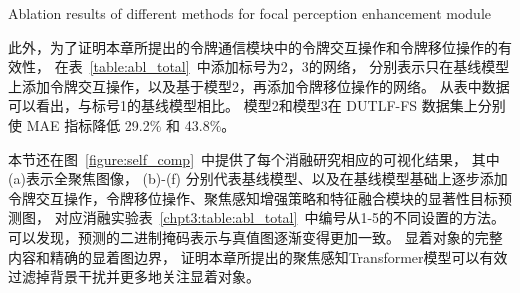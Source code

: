 \begin{table}[!ht]
	{Ablation results of different methods for focal perception enhancement module}
	
	\centering
	\label{table:abl_methods}
\end{table}




此外，为了证明本章所提出的令牌通信模块中的令牌交互操作和令牌移位操作的有效性，
在表~\ref{table:abl_total}~中添加标号为2，3的网络，
分别表示只在基线模型上添加令牌交互操作，以及基于模型2，再添加令牌移位操作的网络。
从表中数据可以看出，与标号1的基线模型相比。
模型2和模型3在 DUTLF-FS 数据集上分别使 MAE 指标降低 29.2\% 和 43.8\%。 




本节还在图~\ref{figure:self_comp}~中提供了每个消融研究相应的可视化结果，
其中(a)表示全聚焦图像，
(b)-(f) 分别代表基线模型、以及在基线模型基础上逐步添加
令牌交互操作，令牌移位操作、聚焦感知增强策略和特征融合模块的显著性目标预测图，
对应消融实验表~\ref{chpt3:table:abl_total}~中编号从1-5的不同设置的方法。
可以发现，预测的二进制掩码表示与真值图逐渐变得更加一致。 
显着对象的完整内容和精确的显着图边界，
证明本章所提出的聚焦感知Transformer模型可以有效过滤掉背景干扰并更多地关注显着对象。 






